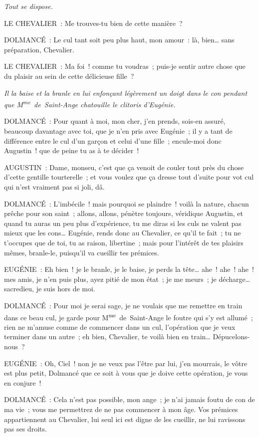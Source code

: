 \documentclass[french,twoside]{book} %
\begin{document}
{\itshape Tout se dispose.}\par
LE CHEVALIER : Me trouves-tu bien de cette manière ?\par
DOLMANCÉ : Le cul tant soit peu plus haut, mon amour : là, bien… sans préparation, Chevalier.\par
LE CHEVALIER : Ma foi ! comme tu voudras ; puis-je sentir autre chose que du plaisir au sein de cette délicieuse fille ?\par
{\itshape Il la baise et la branle en lui enfonçant légèrement un doigt dans le con pendant que M\textsuperscript{me} de Saint-Ange chatouille le clitoris d’Eugénie. }\par
DOLMANCÉ : Pour quant à moi, mon cher, j’en prends, sois-en assuré, beaucoup davantage avec toi, que je n’en pris avec Eugénie ; il y a tant de différence entre le cul d’un garçon et celui d’une fille ; encule-moi donc Augustin ! que de peine tu as à te décider !\par
AUGUSTIN : Dame, monseu, c’est que ça venoit de couler tout près du chose d’cette gentille tourterelle ; et vous voulez que ça dresse tout d’suite pour vot cul qui n’est vraiment pas si joli, dâ.\par
DOLMANCÉ : L’imbécile ! mais pourquoi se plaindre ! voilà la nature, chacun prêche pour son saint ; allons, allons, pénètre toujours, véridique Augustin, et quand tu auras un peu plus d’expérience, tu me diras si les culs ne valent pas mieux que les cons… Eugénie, rends donc au Chevalier, ce qu’il te fait ; tu ne t’occupes que de toi, tu as raison, libertine ; mais pour l’intérêt de tes plaisirs mêmes, branle-le, puisqu’il va cueillir tes prémices.\par
EUGÉNIE : Eh bien ! je le branle, je le baise, je perds la tête… ahe ! ahe ! ahe ! mes amis, je n’en puis plus, ayez pitié de mon état ; je me meurs ; je décharge… sacredieu, je suis hors de moi.\par
DOLMANCÉ : Pour moi je serai sage, je ne voulais que me remettre en train dans ce beau cul, je garde pour M\textsuperscript{me} de Saint-Ange le foutre qui s’y est allumé ; rien ne m’amuse comme de commencer dans un cul, l’opération que je veux terminer dans un autre ; eh bien, Chevalier, te voilà bien en train… Dépucelons-nous ?\par
EUGÉNIE : Oh, Ciel ! non je ne veux pas l’être par lui, j’en mourrais, le vôtre est plus petit, Dolmancé que ce soit à vous que je doive cette opération, je vous en conjure !\par
DOLMANCÉ : Cela n’est pas possible, mon ange ; je n’ai jamais foutu de con de ma vie ; vous me permettrez de ne pas commencer à mon âge. Vos prémices appartiennent au Chevalier, lui seul ici est digne de les cueillir, ne lui ravissons pas ses droits.\par
\end{document}
